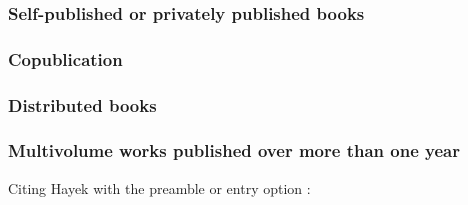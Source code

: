 \documentclass[11pt,letterpaper,oneside]{article}
\begin{document}
\begin{citebib}
\item \cite{windsor1910}
\item \cite{vliet1890}
\end{citebib}

\setcounter{subsubsection}{136}
\subsubsection{Self-published or privately published books}

\begin{citebib}
\item \cite{karavaev2015}
\item \cite{shumaker2014}
\end{citebib}

\setcounter{subsubsection}{139}
\subsubsection{Copublication}

\begin{citebib}
\item \cite{strauss1962}
\end{citebib}

\subsubsection{Distributed books}

\begin{citebib}
\item \cite{willke2007}
\end{citebib}

\setcounter{subsubsection}{143}
\subsubsection{Multivolume works published over more than one year}
\label{14.144}

\begin{citebib}
\item \cite*[329]{hayek2011}
\item \cite{tillich1951}
\end{citebib}

\noindent Citing Hayek with the preamble or entry option
:
\end{document}

